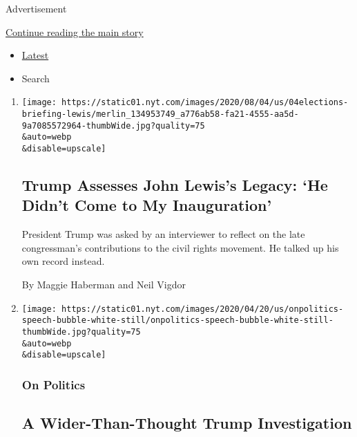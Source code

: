Advertisement

\protect\hyperlink{after-mid1}{Continue reading the main story}

\begin{itemize}
\tightlist
\item
  \protect\hyperlink{stream-panel}{Latest}
\item
  Search
\end{itemize}

\begin{enumerate}
\def\labelenumi{\arabic{enumi}.}
\item
  \href{/2020/08/04/us/politics/trump-john-lewis-axios.html}{}

  \texttt{[image: https://static01.nyt.com/images/2020/08/04/us/04elections-briefing-lewis/merlin\_134953749\_a776ab58-fa21-4555-aa5d-9a7085572964-thumbWide.jpg?quality=75\\\&auto=webp\\\&disable=upscale]}

  \hypertarget{trump-assesses-john-lewiss-legacy-he-didnt-come-to-my-inauguration}{%
  \subsection{Trump Assesses John Lewis's Legacy: `He Didn't Come to My
  Inauguration'}\label{trump-assesses-john-lewiss-legacy-he-didnt-come-to-my-inauguration}}

  President Trump was asked by an interviewer to reflect on the late
  congressman's contributions to the civil rights movement. He talked up
  his own record instead.

  By Maggie Haberman and Neil Vigdor
\item
  \href{/2020/08/04/us/politics/trump-prosecutors.html}{}

  \texttt{[image: https://static01.nyt.com/images/2020/04/20/us/onpolitics-speech-bubble-white-still/onpolitics-speech-bubble-white-still-thumbWide.jpg?quality=75\\\&auto=webp\\\&disable=upscale]}

  \hypertarget{on-politics}{%
  \subsubsection{On Politics}\label{on-politics}}

  \hypertarget{a-wider-than-thought-trump-investigation}{%
  \subsection{A Wider-Than-Thought Trump
  Investigation}\label{a-wider-than-thought-trump-investigation}}


\end{enumerate}

